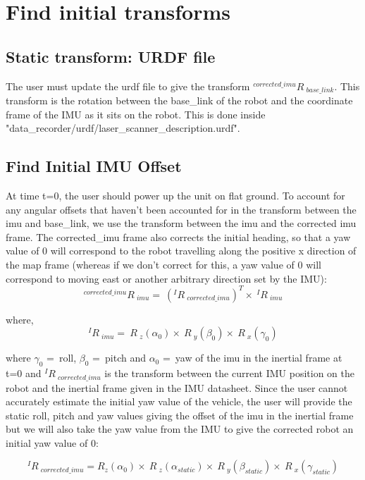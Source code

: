\documentclass{article}
\begin{document}
\section{Find initial transforms}

\subsection{Static transform: URDF file}
The user must update the urdf file to give the transform $ {^{corrected\_imu}R\ _{base\_link}} $. This transform is the rotation between the base\_link of the robot and the coordinate frame of the IMU as it sits on the robot. This is done inside "data\_recorder/urdf/laser\_scanner\_description.urdf".

\subsection{Find Initial IMU Offset}
At time t=0, the user should power up the unit on flat ground. To account for any angular offsets that haven't been accounted for in the transform between the imu and base\_link, we use the transform between the imu and the corrected imu frame. The corrected\_imu frame also corrects the initial heading, so that a yaw value of 0 will correspond to the robot travelling along the positive x direction of the map frame (whereas if we don't correct for this, a yaw value of 0 will correspond to moving east or another arbitrary direction set by the IMU):
\begin{equation}
^{corrected\_imu}R\ _{imu} =\ (^{I}R\ _{corrected\_imu})^T \times\  ^{I}R\ _{imu}
\end{equation}

where,
\begin{equation}
^{I}R\ _{imu} =\ R\ _z(\alpha_0) \times\  R\ _y(\beta_0) \times\  R\ _x(\gamma_0) 
\end{equation}

where $\gamma_0$ =\ roll, $\beta_0$ =\ pitch and $\alpha_0$ =\ yaw of the imu in the inertial frame at t=0 and $^{I}R\ _{corrected\_imu} $ is the transform between the current IMU position on the robot and the inertial frame given in the IMU datasheet. Since the user cannot accurately estimate the initial yaw value of the vehicle, the user will provide the static roll, pitch and yaw values giving the offset of the imu in the inertial frame but we will also take the yaw value from the IMU to give the corrected robot an initial yaw value of 0:

\begin{equation}
^{I}R\ _{corrected\_imu} = R_z(\alpha_0) \times\ R\ _z(\alpha_{static}) \times\  R\ _y(\beta_{static}) \times\  R\ _x(\gamma_{static})
\end{equation}
\end{document}
